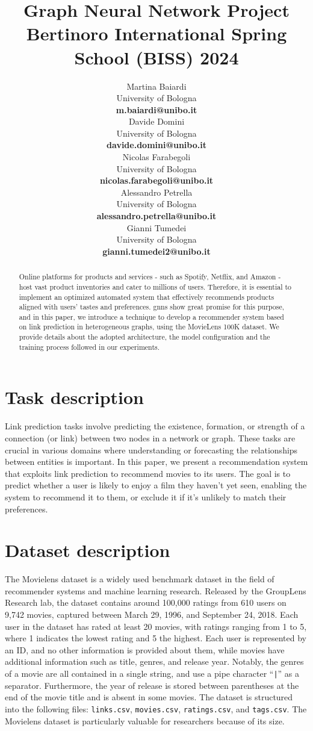 \documentclass[11pt]{article}
\title{Graph Neural Network Project \\
Bertinoro International Spring School (BISS) 2024}
\author{
  Martina Baiardi \\
  University of Bologna \\
  {\bf m.baiardi@unibo.it} \\ \And
  Davide Domini \\
  University of Bologna \\
  {\bf davide.domini@unibo.it} \\  \And
  Nicolas Farabegoli \\
  University of Bologna \\
  {\bf nicolas.farabegoli@unibo.it} \\  \AND
  Alessandro Petrella\\
  University of Bologna \\
  {\bf alessandro.petrella@unibo.it} \\ \And
  Gianni Tumedei \\
  University of Bologna \\
  {\bf gianni.tumedei2@unibo.it}
}
\begin{document}
\maketitle

\begin{abstract}

Online platforms for products and services - such as Spotify, Netflix, and Amazon - 
host vast product inventories and cater to millions of users. 
Therefore, it is essential to implement an optimized automated system that effectively 
recommends products aligned with users' tastes and preferences.  
%
\acp{gnn} show great promise for this purpose, and in this paper, 
we introduce a technique to develop a recommender system based on 
link prediction in heterogeneous graphs, using the MovieLens 100K dataset.
%
We provide details about the adopted architecture, the model configuration and the training
process followed in our experiments.


\end{abstract}

\section{Task description}\label{sec:task-description}
Link prediction tasks involve predicting the existence, formation, 
or strength of a connection (or link) between two nodes in a network or graph. 
These tasks are crucial in various domains where understanding or forecasting the relationships 
between entities is important. 
In this paper, we present a recommendation system that exploits link prediction to recommend movies to its users.
The goal is to predict whether a user is likely to enjoy a film they haven't yet seen, 
enabling the system to recommend it to them, or exclude it if it's unlikely to match their preferences.


\section{Dataset description}\label{sec:dataset-description}
The Movielens dataset \cite{harper2015movielens} is a widely used benchmark dataset in the field of recommender systems and machine learning research. 
Released by the GroupLens Research lab, the dataset contains around 100,000 ratings from 610 users on 9,742 movies, 
captured between March 29, 1996, and September 24, 2018. 
Each user in the dataset has rated at least 20 movies, with ratings ranging from 1 to 5, where 1 indicates the lowest rating and 5 the highest.
Each user is represented by an ID, and no other information is provided about them, while movies have additional information such as title, genres, and release year. Notably, the genres of a movie are all contained in a single string, and use a pipe character ``\texttt{|}'' as a separator. Furthermore, the year of release is stored between parentheses at the end of the movie title and is absent in some movies.
The dataset is structured into the following files: \texttt{links.csv}, \texttt{movies.csv}, \texttt{ratings.csv}, and \texttt{tags.csv}.
The Movielens dataset is particularly valuable for researchers because of its size.
\end{document}
